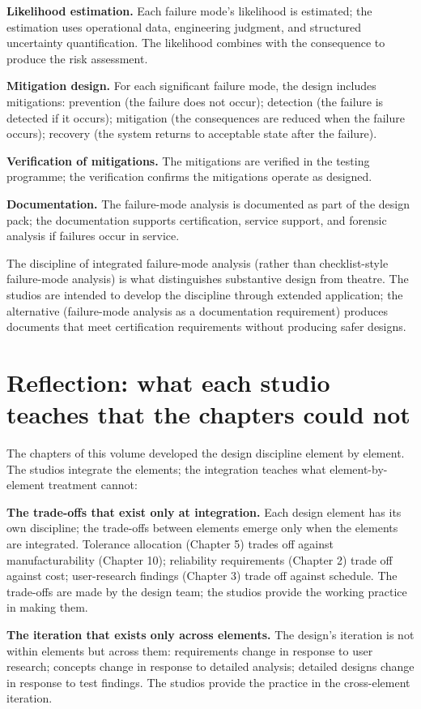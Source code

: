 \textbf{Likelihood estimation.} Each failure mode's likelihood is estimated; the estimation uses operational data, engineering judgment, and structured uncertainty quantification. The likelihood combines with the consequence to produce the risk assessment.

\textbf{Mitigation design.} For each significant failure mode, the design includes mitigations: prevention (the failure does not occur); detection (the failure is detected if it occurs); mitigation (the consequences are reduced when the failure occurs); recovery (the system returns to acceptable state after the failure).

\textbf{Verification of mitigations.} The mitigations are verified in the testing programme; the verification confirms the mitigations operate as designed.

\textbf{Documentation.} The failure-mode analysis is documented as part of the design pack; the documentation supports certification, service support, and forensic analysis if failures occur in service.

The discipline of integrated failure-mode analysis (rather than checklist-style failure-mode analysis) is what distinguishes substantive design from theatre. The studios are intended to develop the discipline through extended application; the alternative (failure-mode analysis as a documentation requirement) produces documents that meet certification requirements without producing safer designs.

\section{Reflection: what each studio teaches that the chapters could not}

The chapters of this volume developed the design discipline element by element. The studios integrate the elements; the integration teaches what element-by-element treatment cannot:

\textbf{The trade-offs that exist only at integration.} Each design element has its own discipline; the trade-offs between elements emerge only when the elements are integrated. Tolerance allocation (Chapter 5) trades off against manufacturability (Chapter 10); reliability requirements (Chapter 2) trade off against cost; user-research findings (Chapter 3) trade off against schedule. The trade-offs are made by the design team; the studios provide the working practice in making them.

\textbf{The iteration that exists only across elements.} The design's iteration is not within elements but across them: requirements change in response to user research; concepts change in response to detailed analysis; detailed designs change in response to test findings. The studios provide the practice in the cross-element iteration.


